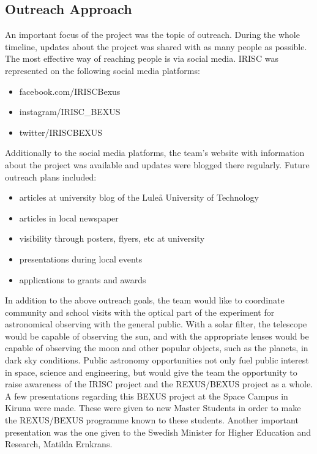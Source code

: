 
\subsection{Outreach Approach}
An important focus of the project was the topic of outreach. During the whole timeline, updates about the project was shared with as many people as possible. The most effective way of reaching people is via social media. IRISC was represented on the following social media platforms:
\begin{itemize}
	\item facebook.com/IRISCBexus
	\item instagram/IRISC\_BEXUS
	\item twitter/IRISCBEXUS
\end{itemize}
Additionally to the social media platforms, the team's website with information about the project was available and updates were blogged there regularly.\newline\newline
Future outreach plans included:
\begin{itemize}
	\item articles at university blog of the Lule{\aa} University of Technology
	\item articles in local newspaper
	\item visibility through posters, flyers, etc at university
	\item presentations during local events
	\item applications to grants and awards
\end{itemize}

In addition to the above outreach goals, the team would like to coordinate community and school visits with the optical part of the experiment for astronomical observing with the general public. With a solar filter, the telescope would be capable of observing the sun, and with the appropriate lenses would be capable of observing the moon and other popular objects, such as the planets, in dark sky conditions. Public astronomy opportunities not only fuel public interest in space, science and engineering, but would give the team the opportunity to raise awareness of the IRISC project and the REXUS/BEXUS project as a whole.\\
A few presentations regarding this BEXUS project at the Space Campus in Kiruna were made. These were given to new Master Students in order to make the REXUS/BEXUS programme known to these students. Another important presentation was the one given to the Swedish Minister for Higher Education and Research, Matilda Ernkrans.